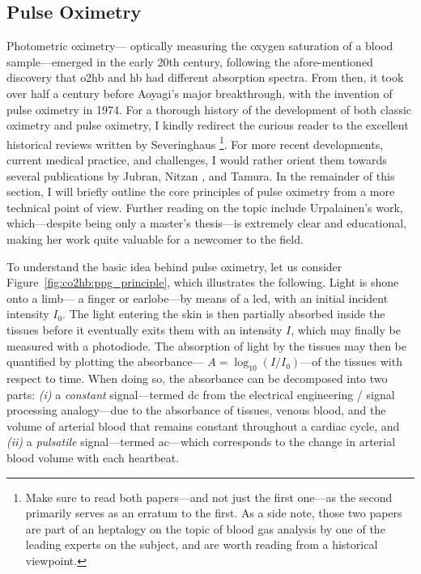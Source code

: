 \subsection{Pulse Oximetry}\label{sect:co2hb:pulse_oximetry}

Photometric oximetry---\ie{} optically measuring the oxygen saturation of a blood sample---emerged in the early 20th century, following the afore-mentioned discovery that \gls{o2hb} and \gls{hb} had different absorption spectra. From then, it took over half a century before Aoyagi's major breakthrough, with the invention of pulse oximetry in 1974\cite{miyasaka2021}. For a thorough history of the development of both classic oximetry and pulse oximetry, I kindly redirect the curious reader to the excellent historical reviews written by Severinghaus \etal{}\cite{severinghaus1986_6, severinghaus1987_vii}\footnote{Make sure to read both papers---and not just the first one---as the second primarily serves as an erratum to the first. As a side note, those two papers are part of an heptalogy on the topic of blood gas analysis by one of the leading experts on the subject, and are worth reading from a historical viewpoint.}. For more recent developments, current medical practice, and challenges, I would rather orient them towards several publications by Jubran\cite{jubran2015}, Nitzan \etal\cite{nitzan2014}, and Tamura\cite{tamura2019}. In the remainder of this section, I will briefly outline the core principles of pulse oximetry from a more technical point of view. Further reading on the topic include Urpalainen's work, which---despite being only a master's thesis---is extremely clear and educational, making her work quite valuable for a newcomer to the field\cite[Chap.~2]{katja2011}.

To understand the basic idea behind pulse oximetry, let us consider Figure~\ref{fig:co2hb:ppg_principle}, which illustrates the following. Light is shone onto a limb---\eg{} a finger or earlobe---by means of a \gls{led}, with an initial incident intensity $I_0$. The light entering the skin is then partially absorbed inside the tissues before it eventually exits them with an intensity $I$, which may finally be measured with a photodiode. The absorption of light by the tissues may then be quantified by plotting the absorbance---\ie{} $A=\log_{10}(I/I_0)$---of the tissues with respect to time. When doing so, the absorbance can be decomposed into two parts: \textit{(i)} a \emph{constant} signal---termed \gls{dc} from the electrical engineering / signal processing analogy---due to the absorbance of tissues, venous blood, and the volume of arterial blood that remains constant throughout a cardiac cycle, and \textit{(ii)} a \emph{pulsatile} signal---termed \gls{ac}---which corresponds to the change in arterial blood volume with each heartbeat.

